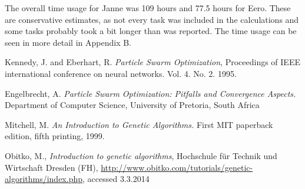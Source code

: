 \documentclass[twoside]{article}
\begin{document}
\begin{multicols}{2}
The overall time usage for Janne was 109 hours and 77.5 hours for Eero. These are conservative estimates, as not every task was included in the calculations and some tasks probably took a bit longer than was reported. The time usage can be seen in more detail in Appendix B.



\begin{thebibliography}{99} %
 Kennedy, J. and Eberhart, R.
  \emph{Particle Swarm Optimization},
 Proceedings of IEEE international conference on neural networks. Vol. 4. No. 2. 1995. 

 Engelbrecht, A. \emph{Particle Swarm Optimization: Pitfalls and Convergence Aspects.}
 Department of Computer Science, University of Pretoria, South Africa
 
Mitchell, M. \emph{An Introduction to Genetic Algorithms.} First MIT paperback edition, fifth printing, 1999. 
 
Obitko, M., \emph{Introduction to genetic algorithms}, Hochschule f\"ur Technik und Wirtschaft Dresden (FH), \url{http://www.obitko.com/tutorials/genetic-algorithms/index.php}, accessed 3.3.2014

\end{thebibliography}


\end{multicols}
\newpage
\appendix
\end{document}
